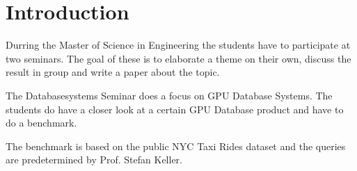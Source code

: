 \chapter{Introduction}
\label{introduction}

Durring the Master of Science in Engineering the students have to participate at two seminars.
The goal of these is to elaborate a theme on their own, discuss the result in group and write a paper about the topic.

The Databasesystems Seminar does a focus on GPU Database Systems.
The students do have a closer look at a certain GPU Database product and have to do a benchmark.

The benchmark is based on the public NYC Taxi Rides dataset and the queries are predetermined by Prof. Stefan Keller.

